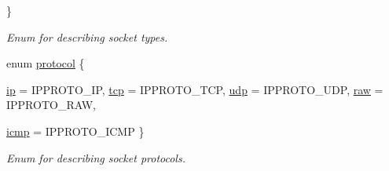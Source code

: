 \begin{CompactItemize}
 \}
\begin{CompactList}\small\item\em Enum for describing socket types. \item\end{CompactList}\item 
enum \hyperlink{classusock_1_1BaseSocket_09208675b41c416fb402824742963eaa}{protocol} \{ \par
\hyperlink{classusock_1_1BaseSocket_09208675b41c416fb402824742963eaabf22c7bfd50adb88e468d3744e932497}{ip} =  IPPROTO\_\-IP, 
\hyperlink{classusock_1_1BaseSocket_09208675b41c416fb402824742963eaa3a17ad9b4036c0957dc098c76e8fba2a}{tcp} =  IPPROTO\_\-TCP, 
\hyperlink{classusock_1_1BaseSocket_09208675b41c416fb402824742963eaae0719b1eee901237a5ec0ba9031cdfce}{udp} =  IPPROTO\_\-UDP, 
\hyperlink{classusock_1_1BaseSocket_09208675b41c416fb402824742963eaa0d09509fb52df026fec01b98795f9ac4}{raw} =  IPPROTO\_\-RAW, 
\par
\hyperlink{classusock_1_1BaseSocket_09208675b41c416fb402824742963eaa5c569c4f7525d07ee96857a015d057bb}{icmp} =  IPPROTO\_\-ICMP
 \}
\begin{CompactList}\small\item\em Enum for describing socket protocols. \item\end{CompactList}\end{CompactItemize}
